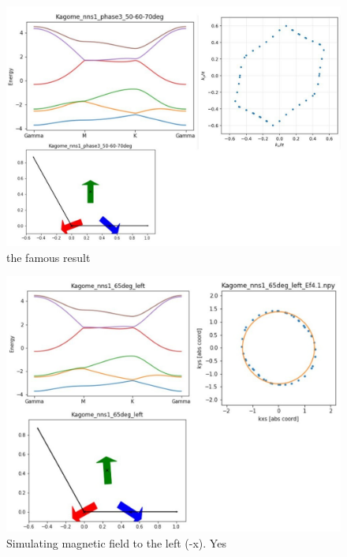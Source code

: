 \documentclass[prb,showpacs,amsmath,amssymb,superscriptaddress,twocolumn,floatfix]{revtex4-1}
\begin{document}
\begin{appendix}
\begin{figure}
	\centering
	\includegraphics[width=0.7\linewidth]{img_total/total_Kagome_phase3_50-60-70}
	\caption{the famous result}
	\label{fig:totalkagomephase350-60-70}
\end{figure}

\begin{figure}
	\centering
	\includegraphics[width=0.7\linewidth]{img_total/total_Kagome_phase3_65L}
	\caption{Simulating magnetic field to the left (-x). Yes}
	\label{fig:totalkagomephase365l}
\end{figure}



\end{appendix}

\def\urlprefix{}
\def\url#1{}
\end{document}
